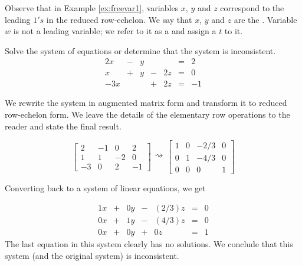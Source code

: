 \documentclass{ximera}
\begin{document}
Observe that in Example \ref{ex:freevar1}, variables $x$, $y$ and $z$ correspond to the leading $1's$ in the reduced row-echelon.  We say that $x$, $y$ and $z$ are the .  Variable $w$ is not a leading variable; we refer to it as a  and assign a  $t$ to it.

\begin{example}\label{ex:nosolutionssys}
Solve the system of equations or determine that the system is inconsistent.
$$\begin{array}{ccccccc}
      2x & -&y&&&= &2 \\
	 x& +&y&-&2z&=&0\\
     -3x& &&+&2z&=&-1
    \end{array}$$
    
    \begin{explanation}
    We rewrite the system in augmented matrix form and transform it to reduced row-echelon form.  We leave the details of the elementary row operations to the reader and state the final result.
    
   \begin{equation}\label{eq:sys20nosolutionsys} \left[\begin{array}{ccc|c}  
 2&-1&0&2\\1&1&-2&0\\-3&0&2&-1
 \end{array}\right]\begin{array}{c}
 \\
 \rightsquigarrow\\
 \\
 \end{array}\left[\begin{array}{ccc|c}  
 1&0&-2/3&0\\0&1&-4/3&0\\0&0&0&1
 \end{array}\right]\end{equation}
    
 Converting back to a system of linear equations, we get
 
 \begin{equation}\label{eq:sys20nosolutions}\begin{array}{ccccccc}
      1x &+ &0y&-&(2/3)z&= &0 \\
	 0x&+ &1y&-&(4/3)z&=&0\\
     0x&+ &0y&+&0z&=&1
    \end{array}\end{equation}
    The last equation in this system clearly has no solutions.  We conclude that this system (and the original system) is inconsistent.
    \end{explanation}
    
\end{example}
\end{document}
